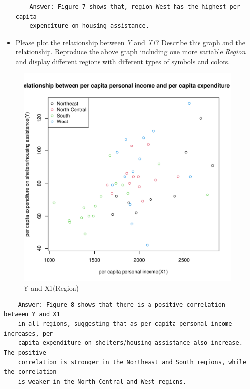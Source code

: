 \documentclass[12pt,letterpaper]{article}
\begin{document}
\begin{itemize}
\newpage
\begin{verbatim} 
	Answer: Figure 7 shows that, region West has the highest per capita 
	expenditure on housing assistance.
\end{verbatim}

\vspace{.5cm}
\item
Please plot the relationship between \emph{Y} and \emph{X1}? Describe this graph and the relationship. Reproduce the above graph including one more variable \emph{Region} and display different regions with different types of symbols and colors.
\end{itemize}
\vspace{.5cm}

  

\begin{figure}[h!]\centering
	\caption{\footnotesize Y and X1(Region)}
	\label{fig:plot_8}
	\includegraphics[width=.75\textwidth]{scatter_plot8_X1&Y_Region.pdf}
\end{figure}
\begin{verbatim} 
	Answer: Figure 8 shows that there is a positive correlation between Y and X1 
	in all regions, suggesting that as per capita personal income increases, per 
	capita expenditure on shelters/housing assistance also increase. The positive 
	correlation is stronger in the Northeast and South regions, while the correlation 
	is weaker in the North Central and West regions.
\end{verbatim}
\end{document}
